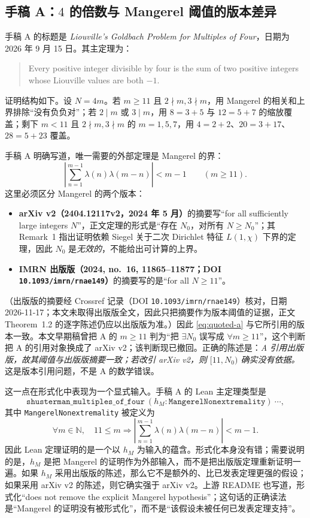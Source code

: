 \documentclass[11pt,a4paper]{ctexart}
\theoremstyle{plain}
\theoremstyle{definition}
\newcommand{\N}{\mathbb{N}}
\newcommand{\li}{\lambda}
\newcommand{\code}[1]{\texttt{#1}}
\begin{document}
\subsection{手稿 A：$4$ 的倍数与 Mangerel 阈值的版本差异}
\label{sec:audit-a}

手稿 A 的标题是 \emph{Liouville's Goldbach Problem for Multiples of Four}，日期为 2026 年 9 月 15 日\cite{captain2026four}。其主定理为：
\begin{quote}
Every positive integer divisible by four is the sum of two positive integers whose Liouville values are both $-1$.
\end{quote}
证明结构如下。设 $N=4m$。若 $m\ge11$ 且 $2\nmid m,3\nmid m$，用 Mangerel 的相关和上界排除“没有负负对”；若 $2\mid m$ 或 $3\mid m$，用 $8=3+5$ 与 $12=5+7$ 的缩放覆盖；剩下 $m<11$ 且 $2\nmid m,3\nmid m$ 的 $m=1,5,7$，用 $4=2+2$、$20=3+17$、$28=5+23$ 覆盖。

手稿 A 明确写道，唯一需要的外部定理是 Mangerel 的界\cite[Theorem~1.2]{mangerel2024}：
\begin{equation}
  \left|\sum_{n=1}^{m-1}\li(n)\li(m-n)\right|<m-1
  \qquad(m\ge11).
  \label{eq:quoted-a}
\end{equation}
这里必须区分 Mangerel 的两个版本：
\begin{itemize}
\item \textbf{arXiv v2（2404.12117v2，2024 年 5 月）}的摘要写“for all sufficiently large integers $N$”，正文定理的形式是“存在 $N_0$，对所有 $N\ge N_0$”；其 Remark~1 指出证明依赖 Siegel 关于二次 Dirichlet 特征 $L(1,\chi)$ 下界的定理，因此 $N_0$ 是\emph{无效的}，不能给出可计算的上界。
\item \textbf{IMRN 出版版（2024, no.~16, 11865--11877；DOI \texttt{10.1093/imrn/rnae149}）}的摘要写的是“for all $N\ge11$”。
\end{itemize}
（出版版的摘要经 Crossref 记录（DOI \texttt{10.1093/imrn/rnae149}）核对，日期 2026-11-17；本文未取得出版版全文，因此只把摘要作为版本阈值的证据，正文 Theorem~1.2 的逐字陈述仍应以出版版为准。）因此 \eqref{eq:quoted-a} 与它所引用的版本一致。本文早期稿曾把 A 的 $m\ge11$ 判为“把 $\exists N_0$ 误写成 $\forall m\ge11$”，这个判断把 A 的引用对象换成了 arXiv v2；该判断现已撤回。正确的陈述是：\emph{A 引用出版版，故其阈值与出版版摘要一致；若改引 arXiv v2，则 $[11,N_0)$ 确实没有依据。}这是版本引用问题，不是 A 的数学错误。

这一点在形式化中表现为一个显式输入。手稿 A 的 Lean 主定理类型是
\[
  \code{shusterman\_multiples\_of\_four}\ (h_M : \code{MangerelNonextremality})\ \cdots,
\]
其中 \code{MangerelNonextremality} 被定义为
\[
  \forall m\in\N,\quad 11\le m\Longrightarrow
  \left|\sum_{n=1}^{m-1}\li(n)\li(m-n)\right|<m-1.
\]
因此 Lean 定理证明的是一个以 $h_M$ 为输入的蕴含。形式化本身没有错；需要说明的是，$h_M$ 是把 Mangerel 的证明作为外部输入，而不是把出版版定理重新证明一遍。如果 $h_M$ 采用出版版的陈述，那么它不是额外的、比已发表定理更强的假设；如果采用 arXiv v2 的陈述，则它确实强于 arXiv v2。上游 README 也写道，形式化“does not remove the explicit Mangerel hypothesis”；这句话的正确读法是“Mangerel 的证明没有被形式化”，而不是“该假设未被任何已发表定理支持”。
\end{document}
